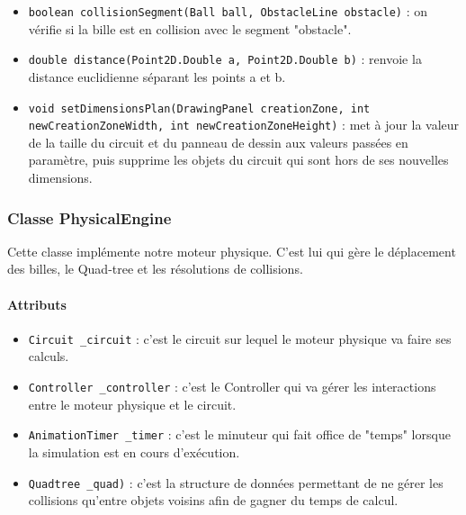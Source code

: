 \documentclass{report}
\begin{document}
\begin{itemize}
\item \texttt{boolean collisionSegment(Ball ball, ObstacleLine obstacle)} : on vérifie si la bille est en collision avec le segment "obstacle". 
\item \texttt{double distance(Point2D.Double a, Point2D.Double b)} : renvoie la distance euclidienne séparant les points a et b.
\item \texttt{void setDimensionsPlan(DrawingPanel creationZone, int newCreationZoneWidth, int newCreationZoneHeight)} : met à jour la valeur de la taille du circuit et du panneau de dessin aux valeurs passées en paramètre, puis supprime les objets du circuit qui sont hors de ses nouvelles dimensions.
\end{itemize}

\newpage
\subsubsection{Classe PhysicalEngine}

Cette classe implémente notre moteur physique. C'est lui qui gère le déplacement des billes, le Quad-tree et les résolutions de collisions.

\paragraph*{Attributs}
\begin{itemize}
\item \texttt{Circuit \_circuit} : c'est le circuit sur lequel le moteur physique va faire ses calculs.
\item \texttt{Controller \_controller} : c'est le Controller qui va gérer les interactions entre le moteur physique et le circuit.
\item \texttt{AnimationTimer \_timer} : c'est le minuteur qui fait office de "temps" lorsque la simulation est en cours d'exécution.
\item \texttt{Quadtree \_quad)} : c'est la structure de données permettant de ne gérer les collisions qu'entre objets voisins afin de gagner du temps de calcul.
\end{itemize}
\end{document}
